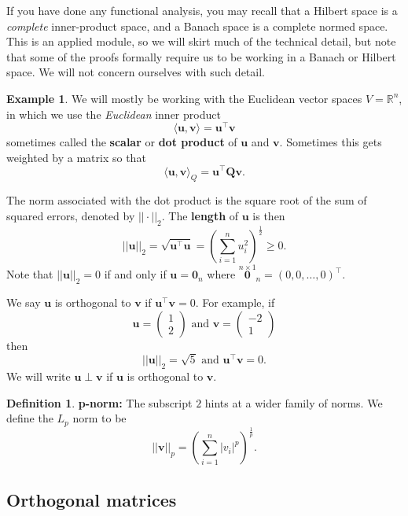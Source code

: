 \documentclass[
]{book}
\theoremstyle{definition}
\newtheorem{definition}{Definition}[chapter]
\theoremstyle{definition}
\newtheorem{example}{Example}[chapter]
\theoremstyle{definition}
\theoremstyle{definition}
\theoremstyle{remark}
\begin{document}
If you have done any functional analysis, you may recall that a Hilbert space is a \emph{complete} inner-product space, and a Banach space is a complete normed space. This is an applied module, so we will skirt much of the technical detail, but note that some of the proofs formally require us to be working in a Banach or Hilbert space. We will not concern ourselves with such detail.

\begin{example}
\protect\hypertarget{exm:Rp3}{}\label{exm:Rp3}We will mostly be working with the Euclidean vector spaces \(V=\mathbb{R}^n\), in which we use the \emph{Euclidean} inner product
\[\langle \mathbf u, \mathbf v\rangle = \mathbf u^\top \mathbf v\]
sometimes called the \textbf{scalar} or \textbf{dot product} of \(\mathbf u\) and \(\mathbf v\). Sometimes this gets weighted by a matrix so that
\[\langle \mathbf u, \mathbf v\rangle_Q = \mathbf u^\top \mathbf Q\mathbf v.\]

The norm associated with the dot product is the square root of the sum of squared errors, denoted by \(|| \cdot ||_2\).
The \textbf{length} of \(\mathbf u\) is then
\[||\mathbf u||_2=\sqrt{\mathbf u^\top \mathbf u} =\left( \sum_{i=1}^n u_i^2\right)^\frac{1}{2}\geq 0.\]
Note that \(||\mathbf u||_2=0\) if and only if \(\mathbf u={\mathbf 0}_n\) where \(\stackrel{n\times 1}{\mathbf 0}_n=(0,0,\dots ,0)^\top\).

We say \(\mathbf u\) is orthogonal to \(\mathbf v\) if \(\mathbf u^\top \mathbf v=0\).
For example, if
\[\mathbf u=\left(\begin{array}{c}1\\2\end{array}\right) \mbox{ and } \mathbf v=\left(\begin{array}{c}-2\\1\end{array}\right)\]
then
\[||\mathbf u||_2 = \sqrt{5}\mbox{ and } \mathbf u^\top \mathbf v=0.\]
We will write \(\mathbf u\perp \mathbf v\) if \(\mathbf u\) is orthogonal to \(\mathbf v\).
\end{example}

\begin{definition}
\protect\hypertarget{def:pnorms}{}\label{def:pnorms}\textbf{p-norm:} The subscript \(2\) hints at a wider family of norms. We define the \(L_p\) norm to be
\[|| \mathbf v||_p = \left(\sum_{i=1}^n |v_i|^p\right)^\frac{1}{p}.\]
\end{definition}

\subsection{Orthogonal matrices}\label{orthogonal-matrices}
\end{document}
